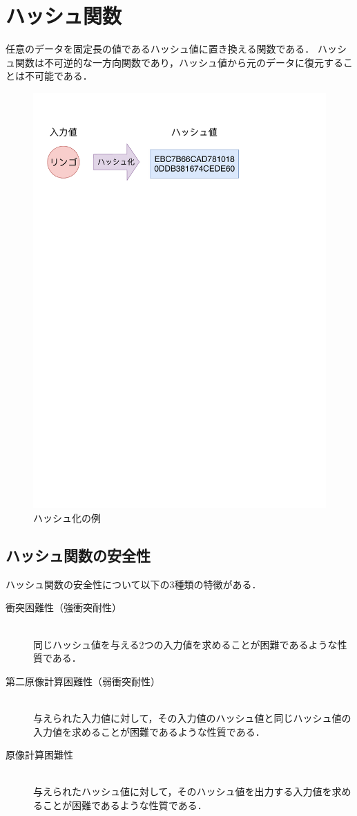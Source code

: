 \documentclass[a4j,12pt]{jsarticle}
\begin{document}
\newpage
\section{ハッシュ関数}

任意のデータを固定長の値であるハッシュ値に置き換える関数である．
ハッシュ関数は不可逆的な一方向関数であり，ハッシュ値から元のデータに復元することは不可能である．

\begin{figure}[H]
\centering
\includegraphics[mediaboxonly=/CropBox,width=12cm]{hash1.pdf}
\caption{ハッシュ化の例}
\label{fig:01}
\end{figure} 


\subsection {ハッシュ関数の安全性}
ハッシュ関数の安全性について以下の3種類の特徴がある．
\begin{description}
\item[衝突困難性（強衝突耐性）]\ \\
同じハッシュ値を与える2つの入力値を求めることが困難であるような性質である．

\item[第二原像計算困難性（弱衝突耐性）]\ \\ 
与えられた入力値に対して，その入力値のハッシュ値と同じハッシュ値の入力値を求めることが困難であるような性質である．

\item[原像計算困難性]\ \\
与えられたハッシュ値に対して，そのハッシュ値を出力する入力値を求めることが困難であるような性質である．
\end{description}
\end{document}
